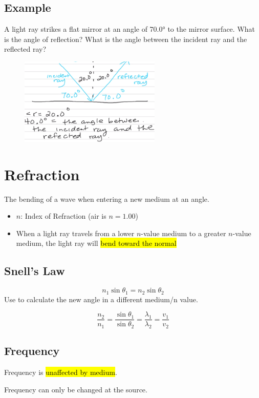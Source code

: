 \documentclass[a4paper,12pt]{article}
\begin{document}
\subsection{Example}
A light ray strikes a flat mirror at an angle of \ang{70.0} to the mirror surface. What is the angle of reflection? What is the angle between the incident ray and the reflected ray?
\begin{figure}[H]
    \centering
    \includegraphics[width=0.6\textwidth]{ex-reflect}
\end{figure}

\section{Refraction}
The bending of a wave when entering a new medium at an angle.

\begin{itemize}
    \item{$n$: Index of Refraction (air is $n = \num{1.00}$)}
    \item{When a light ray travels from a lower $n$-value medium to a greater $n$-value medium, the light ray will \hl{bend toward the normal}}
\end{itemize}

\subsection{Snell's Law}
\Large $$n_1\sin{\theta_1} = n_2\sin{\theta_2}$$ \normalsize
Use to calculate the new angle in a different medium/n value.

\Large $$\frac{n_2}{n_1} = \frac{\sin{\theta_1}}{\sin{\theta_2}} = \frac{\lambda_1}{\lambda_2} = \frac{v_1}{v_2}$$ \normalsize

\subsection{Frequency}
Frequency is \hl{unaffected by medium}. 

Frequency can only be changed at the source.
\end{document}
